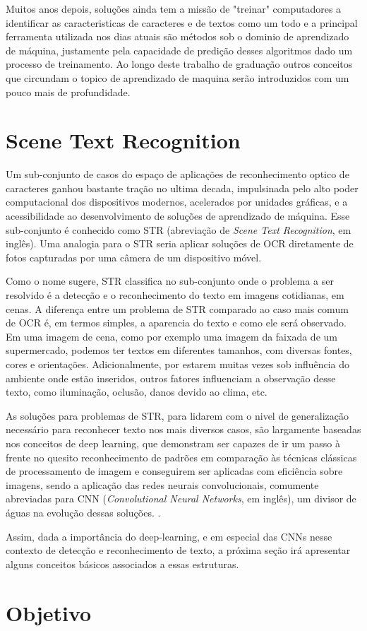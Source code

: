 Muitos anos depois, soluções ainda tem a missão de "treinar" computadores a identificar as caracteristicas de caracteres e de textos como um todo e a principal ferramenta utilizada nos dias atuais são métodos sob o dominio de aprendizado de máquina, justamente pela capacidade de predição desses algoritmos dado um processo de treinamento. Ao longo deste trabalho de graduação outros conceitos que circundam o topico de aprendizado de maquina serão introduzidos com um pouco mais de profundidade.

\section{Scene Text Recognition}

Um sub-conjunto de casos do espaço de aplicações de reconhecimento optico de caracteres ganhou bastante tração no ultima decada, impulsinada pelo alto poder computacional dos dispositivos modernos, acelerados por unidades gráficas, e a acessibilidade ao desenvolvimento de soluções de aprendizado de máquina. Esse sub-conjunto é conhecido como STR (abreviação de \textit{Scene Text Recognition}, em inglês). Uma analogia para o STR seria aplicar soluções de OCR diretamente de fotos capturadas por uma câmera de um dispositivo móvel.

Como o nome sugere, STR classifica no sub-conjunto onde o problema a ser resolvido é a detecção e o reconhecimento do texto em imagens cotidianas, em cenas. A diferença entre um problema de STR comparado ao caso mais comum de OCR é, em termos simples, a aparencia do texto e como ele será observado. Em uma imagem de cena, como por exemplo uma imagem da faixada de um supermercado, podemos ter textos em diferentes tamanhos, com diversas fontes, cores e orientações. Adicionalmente, por estarem muitas vezes sob influência do ambiente onde estão inseridos, outros fatores influenciam a observação desse texto, como iluminação, oclusão, danos devido ao clima, etc.


As soluções para problemas de STR, para lidarem com o nivel de generalização necessário para reconhecer texto nos mais diversos casos, são largamente baseadas nos conceitos de deep learning, que demonstram ser capazes de ir um passo à frente no quesito reconhecimento de padrões em comparação às técnicas clássicas de processamento de imagem e conseguirem ser aplicadas com eficiência sobre imagens, sendo a aplicação das redes neurais convolucionais, comumente abreviadas para CNN (\textit{Convolutional Neural Networks}, em inglês), um divisor de águas na evolução dessas soluções. \cite{DetcRecogWild,StrDlEra}.

Assim, dada a importância do deep-learning, e em especial das CNNs nesse contexto de detecção e reconhecimento de texto, a próxima seção irá apresentar alguns conceitos básicos associados a essas estruturas.

\section{Objetivo}

\lipsum[36]
